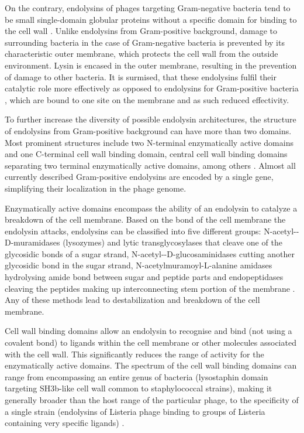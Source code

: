 On the contrary, endolysins of phages targeting Gram-negative bacteria tend to be small single-domain globular proteins without a specific domain for binding to the cell wall \cite{schmelcher2012bacteriophage}. Unlike endolysins from Gram-positive background, damage to surrounding bacteria in the case of Gram-negative bacteria is prevented by its characteristic outer membrane, which protects the cell wall from the outside environment. Lysin is encased in the outer membrane, resulting in the prevention of damage to other bacteria. It is surmised, that these endolysins fulfil their catalytic role more effectively as opposed to endolysins for Gram-positive bacteria \cite{schmelcher2012bacteriophage}, which are bound to one site on the membrane and as such reduced effectivity.

To further increase the diversity of possible endolysin architectures, the structure of endolysins from Gram-positive background can have more than two domains. Most prominent structures include two N-terminal enzymatically active domains and one C-terminal cell wall binding domain, central cell wall binding domains separating two terminal enzymatically active domains, among others \cite{schmelcher2012bacteriophage}. Almost all currently described Gram-positive endolysins are encoded by a single gene, simplifying their localization in the phage genome.

Enzymatically active domains encompass the ability of an endolysin to catalyze a breakdown of the cell membrane. Based on the bond of the cell membrane the endolysin attacks, endolysins can be classified into five different groups: N-acetyl-\textbeta-D-muramidases (lysozymes) and lytic transglycosylases that cleave one of the glycosidic bonds of a sugar strand, N-acetyl-\textbeta-D-glucosaminidases cutting another glycosidic bond in the sugar strand, N-acetylmuramoyl-L-alanine amidases hydrolysing amide bond between sugar and peptide parts and endopeptidases cleaving the peptides making up interconnecting stem portion of the membrane \cite{schmelcher2012bacteriophage}. Any of these methods lead to destabilization and breakdown of the cell membrane.

Cell wall binding domains allow an endolysin to recognise and bind (not using a covalent bond) to ligands within the cell membrane or other molecules associated with the cell wall. This significantly reduces the range of activity for the enzymatically active domains. The spectrum of the cell wall binding domains can range from encompassing an entire genus of bacteria (lysostaphin domain targeting SH3b-like cell wall common to staphylococcal strains), making it generally broader than the host range of the particular phage, to the specificity of a single strain (endolysins of Listeria phage binding to groups of Listeria containing very specific ligands) \cite{schmelcher2012bacteriophage}.

